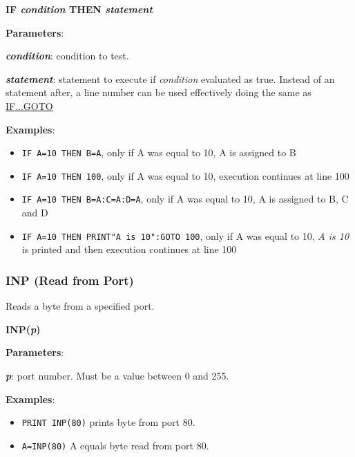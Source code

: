     \hspace{1.9cm}\textbf{IF \textit{condition} THEN \textit{statement}}

    \textbf{Parameters}:

    \hspace{1cm}\textbf{\textit{condition}}: condition to test.

    \hspace{1cm}\textbf{\textit{statement}}: statement to execute if
    \textit{condition} evaluated as true. Instead of an statement after, a line
    number can be used effectively doing the same as
    \hyperref[msbasic:lang:ifgoto]{IF...GOTO}

    \textbf{Examples}:
    \begin{itemize}
        \item \texttt{IF A=10 THEN B=A}, only if A was equal to 10, A is
        assigned to B
        \item \texttt{IF A=10 THEN 100}, only if A was equal to 10, execution
        continues at line 100
        \item \texttt{IF A=10 THEN B=A:C=A:D=A}, only if A was equal to 10, A is
        assigned to B, C and D
        \item \texttt{IF A=10 THEN PRINT"A is 10":GOTO 100}, only if A was equal
        to 10, \textit{A is 10} is printed and then execution continues at line
        100
    \end{itemize}

    \subsubsection{{INP (Read from Port)}}
    \label{msbasic:lang:inp}
    Reads a byte from a specified port.

    \hspace{1.9cm}\textbf{INP(\textit{p})}

    \textbf{Parameters}:

    \hspace{1cm}\textbf{\textit{p}}: port number. Must be a value between 0 and
    255.

    \textbf{Examples}:
    \begin{itemize}
        \item \texttt{PRINT INP(80)} prints byte from port 80.
        \item \texttt{A=INP(80)} A equals byte read from port 80.
    \end{itemize}

